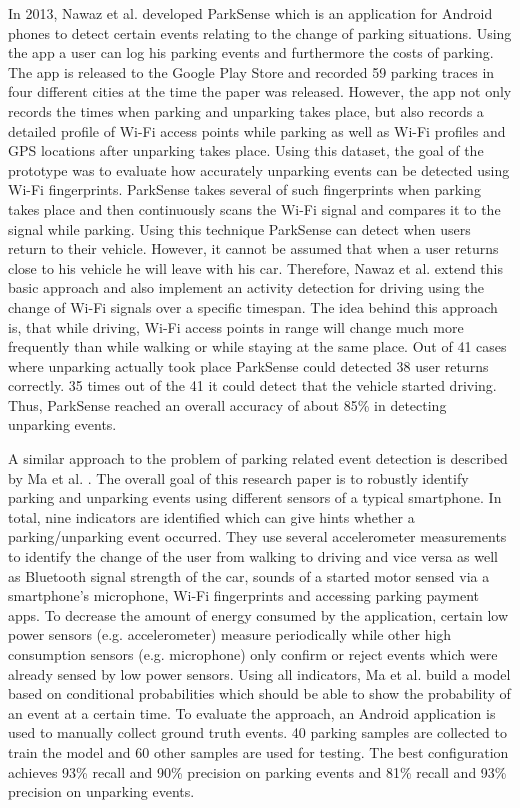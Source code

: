 In 2013, Nawaz et al. developed ParkSense \cite{Nawaz:2013:PSB:2500423.2500438} which is an application for Android phones to detect certain events relating to the change of parking situations. Using the app a user can log his parking events and furthermore the costs of parking. The app is released to the Google Play Store and recorded 59 parking traces in four different cities at the time the paper was released. However, the app not only records the times when parking and unparking takes place, but also records a detailed profile of Wi-Fi access points while parking as well as Wi-Fi profiles and GPS locations after unparking takes place. Using this dataset, the goal of the prototype was to evaluate how accurately unparking events can be detected using Wi-Fi fingerprints. ParkSense takes several of such fingerprints when parking takes place and then continuously scans the Wi-Fi signal and compares it to the signal while parking. Using this technique ParkSense can detect when users return to their vehicle. However, it cannot be assumed that when a user returns close to his vehicle he will leave with his car. Therefore, Nawaz et al. extend this basic approach and also implement an activity detection for driving using the change of Wi-Fi signals over a specific timespan. The idea behind this approach is, that while driving, Wi-Fi access points in range will change much more frequently than while walking or while staying at the same place. Out of 41 cases where unparking actually took place ParkSense could detected 38 user returns correctly. 35 times out of the 41 it could detect that the vehicle started driving. Thus, ParkSense reached an overall accuracy of about 85\% in detecting unparking events.

A similar approach to the problem of parking related event detection is described by Ma et al. \cite{Ma:2014:USP:2674918.2674929}. The overall goal of this research paper is to robustly identify parking and unparking events using different sensors of a typical smartphone. In total, nine indicators are identified which can give hints whether a parking/unparking event occurred. They use several accelerometer measurements to identify the change of the user from walking to driving and vice versa as well as Bluetooth signal strength of the car, sounds of a started motor sensed via a smartphone's microphone, Wi-Fi fingerprints and accessing parking payment apps. To decrease the amount of energy consumed by the application, certain low power sensors (e.g. accelerometer) measure periodically while other high consumption sensors (e.g. microphone) only confirm or reject events which were already sensed by low power sensors. Using all indicators, Ma et al. build a model based on conditional probabilities which should be able to show the probability of an event at a certain time. To evaluate the approach, an Android application is used to manually collect ground truth events. 40 parking samples are collected to train the model and 60 other samples are used for testing. The best configuration achieves 93\% recall and 90\% precision on parking events and 81\% recall and 93\% precision on unparking events.



